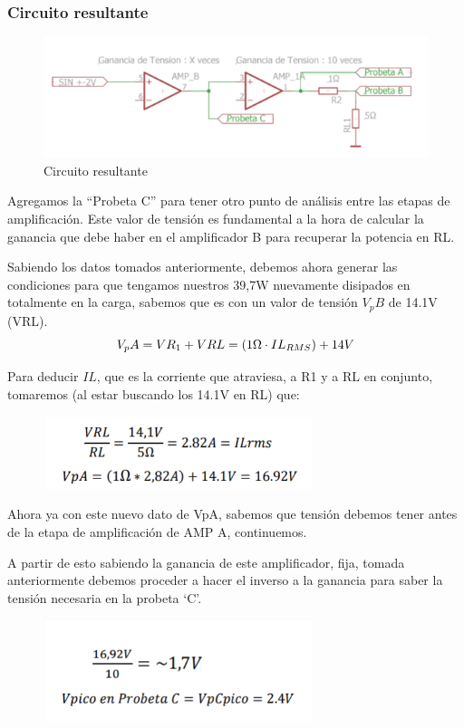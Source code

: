 \documentclass[../main.tex]{subfiles}
\begin{document}
		\subsubsection*{Circuito resultante}
		\begin{figure}[H]
			\includegraphics[width=\textwidth]{imagen10.png}
			\centering
			\caption{Circuito resultante}
		\end{figure}

	Agregamos la ``Probeta C'' para tener otro punto de análisis entre las etapas de 
	amplificación. Este valor de tensión es fundamental a la hora de calcular la 
	ganancia que debe haber en el amplificador B para recuperar la potencia en RL. 

	Sabiendo los datos tomados anteriormente, debemos ahora generar las condiciones 
	para que tengamos nuestros 39,7W nuevamente disipados en totalmente en la carga, 
	sabemos que es con un valor de tensión $V_pB$ de 14.1V (VRL).
	\[
		V_pA = VR_1 + VRL = (1\Omega \cdot IL_{RMS}) + 14V
	\]

	Para deducir $IL$, que es la corriente que atraviesa, a R1 y a RL en conjunto, tomaremos (al estar buscando los 14.1V en RL) que:
	\begin{figure}[H]
		\includegraphics[width=0.7\textwidth]{imagen11.png}
		\centering
	\end{figure}

	Ahora ya con este nuevo dato de VpA, sabemos que tensión debemos tener antes de 
	la etapa de amplificación de AMP A, continuemos.
	
	A partir de esto sabiendo la ganancia de este amplificador, fija, tomada 
	anteriormente debemos proceder a hacer el inverso a la ganancia para saber la 
	tensión necesaria en la probeta ‘C’.

	\begin{figure}[H]
		\includegraphics[width=0.7\textwidth]{imagen12.png}
		\centering
	\end{figure}
\end{document}
